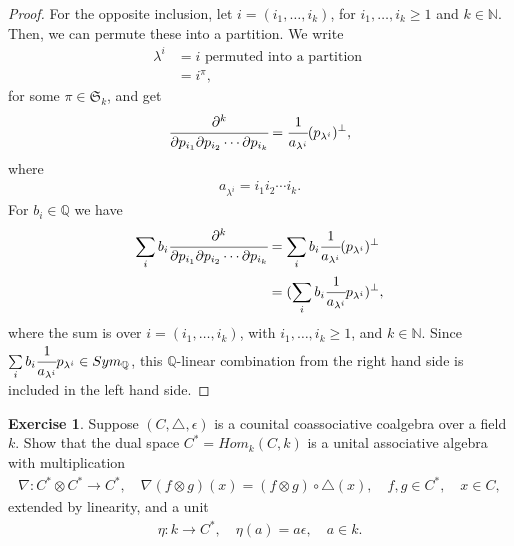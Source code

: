 \documentclass[8pt]{extarticle}
\newcommand{\N}{\mathbb{N}}
\newcommand{\Q}{\mathbb{Q}}
\newcommand{\<}{\langle}
\renewcommand{\>}{\rangle}
\theoremstyle{definition}
\newtheorem{exercise}{Exercise}
\begin{document}
\begin{proof}
  For the opposite inclusion, let $i = (i_1, \dots, i_k)$, for $i_1, \dots, i_k \geq 1$ and $k \in \N$. Then, we can permute these into a partition. We write
  \begin{align*}
    \lambda^i
    &= i \text{ permuted into a partition } \\
    &= i^{\pi},
  \end{align*}
  for some $\pi \in \mathfrak{S}_k$, and get
  \begin{align*}
    \cfrac{\partial^k}{\partial p_{i_1} \partial p_{i_2} \cdots \partial p_{i_k}} = \cfrac{1}{a_{\lambda^i}} (p_{\lambda^i})^{\perp},
  \end{align*}
  where
  \begin{align*}
    a_{\lambda^i} = i_1 i_2 \cdots i_k.
  \end{align*}
  For $b_{i} \in \Q$ we have
  \begin{align*}
    \sum\limits_{i} b_{i}\cfrac{\partial^k}{\partial p_{i_1} \partial p_{i_2} \cdots \partial p_{i_k}}
    &=
    \sum\limits_{i} b_{i}\cfrac{1}{a_{\lambda^i}} (p_{\lambda^i})^{\perp} \\
    &=
    (\sum\limits_{i} b_{i}\cfrac{1}{a_{\lambda^i}}p_{\lambda^i})^{\perp},
  \end{align*}
  where the sum is over $i=(i_1, \dots, i_k)$, with $i_1, \dots, i_k \geq 1$, and $k \in \N$. Since $\sum\limits_{i} b_{i}\cfrac{1}{a_{\lambda^i}}p_{\lambda^i} \in Sym_{\Q}$, this $\Q$-linear combination from the right hand side is included in the left hand side.
\end{proof}
\newpage
\begin{exercise}
  Suppose $(C, \triangle, \epsilon)$ is a counital coassociative coalgebra over a field $k$. Show that the dual space $C^* = Hom_k(C,k)$ is a unital associative algebra with multiplication
  \begin{align*}
    \nabla: C^* \otimes C^* \to C^*, \quad \nabla(f \otimes g)(x) = (f \otimes g) \circ \triangle(x), \quad f, g \in C^*, \quad x \in C,
  \end{align*}
  extended by linearity, and a unit
  \begin{align*}
    \eta: k \to C^* , \quad \eta(a) = a\epsilon, \quad a \in k.
  \end{align*}
\end{exercise}
\end{document}
